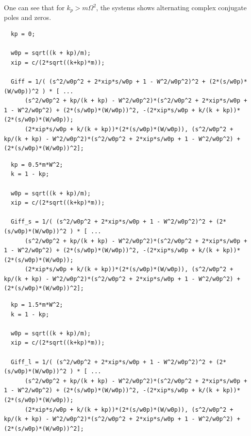 \documentclass[a4paper, 10pt, DIV=12, parskip=full]{scrreprt}
\begin{document}
One can see that for \(k_p > m \Omega^2\), the systems shows alternating complex conjugate poles and zeros.

\begin{verbatim}
  kp = 0;

  w0p = sqrt((k + kp)/m);
  xip = c/(2*sqrt((k+kp)*m));

  Giff = 1/( (s^2/w0p^2 + 2*xip*s/w0p + 1 - W^2/w0p^2)^2 + (2*(s/w0p)*(W/w0p))^2 ) * [ ...
      (s^2/w0p^2 + kp/(k + kp) - W^2/w0p^2)*(s^2/w0p^2 + 2*xip*s/w0p + 1 - W^2/w0p^2) + (2*(s/w0p)*(W/w0p))^2, -(2*xip*s/w0p + k/(k + kp))*(2*(s/w0p)*(W/w0p));
      (2*xip*s/w0p + k/(k + kp))*(2*(s/w0p)*(W/w0p)), (s^2/w0p^2 + kp/(k + kp) - W^2/w0p^2)*(s^2/w0p^2 + 2*xip*s/w0p + 1 - W^2/w0p^2) + (2*(s/w0p)*(W/w0p))^2];
\end{verbatim}

\begin{verbatim}
  kp = 0.5*m*W^2;
  k = 1 - kp;

  w0p = sqrt((k + kp)/m);
  xip = c/(2*sqrt((k+kp)*m));

  Giff_s = 1/( (s^2/w0p^2 + 2*xip*s/w0p + 1 - W^2/w0p^2)^2 + (2*(s/w0p)*(W/w0p))^2 ) * [ ...
      (s^2/w0p^2 + kp/(k + kp) - W^2/w0p^2)*(s^2/w0p^2 + 2*xip*s/w0p + 1 - W^2/w0p^2) + (2*(s/w0p)*(W/w0p))^2, -(2*xip*s/w0p + k/(k + kp))*(2*(s/w0p)*(W/w0p));
      (2*xip*s/w0p + k/(k + kp))*(2*(s/w0p)*(W/w0p)), (s^2/w0p^2 + kp/(k + kp) - W^2/w0p^2)*(s^2/w0p^2 + 2*xip*s/w0p + 1 - W^2/w0p^2) + (2*(s/w0p)*(W/w0p))^2];
\end{verbatim}

\begin{verbatim}
  kp = 1.5*m*W^2;
  k = 1 - kp;

  w0p = sqrt((k + kp)/m);
  xip = c/(2*sqrt((k+kp)*m));

  Giff_l = 1/( (s^2/w0p^2 + 2*xip*s/w0p + 1 - W^2/w0p^2)^2 + (2*(s/w0p)*(W/w0p))^2 ) * [ ...
      (s^2/w0p^2 + kp/(k + kp) - W^2/w0p^2)*(s^2/w0p^2 + 2*xip*s/w0p + 1 - W^2/w0p^2) + (2*(s/w0p)*(W/w0p))^2, -(2*xip*s/w0p + k/(k + kp))*(2*(s/w0p)*(W/w0p));
      (2*xip*s/w0p + k/(k + kp))*(2*(s/w0p)*(W/w0p)), (s^2/w0p^2 + kp/(k + kp) - W^2/w0p^2)*(s^2/w0p^2 + 2*xip*s/w0p + 1 - W^2/w0p^2) + (2*(s/w0p)*(W/w0p))^2];
\end{verbatim}
\end{document}
